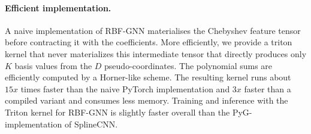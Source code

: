 \documentclass{article} %
\newcommand{\ours}{RBF-GNN}
\begin{document}
\paragraph{Efficient implementation.}
A naive implementation of \ours{} materialises the Chebyshev feature tensor before contracting it with the coefficients.
More efficiently, we provide a triton kernel that never materializes this intermediate tensor that directly produces only $K$ basis values from the $D$ pseudo-coordinates.
The polynomial sums are efficiently computed by a Horner-like scheme.
The resulting kernel runs about $15x$ times faster than the naive  PyTorch implementation and $3x$ faster than a compiled variant and consumes less memory.
Training and inference with the Triton kernel for \ours{} is slightly faster overall than the PyG-implementation of SplineCNN.
\end{document}
